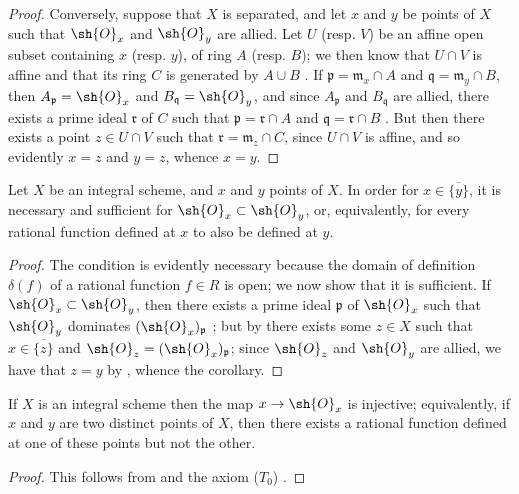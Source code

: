 \begin{proof}
Conversely, suppose that $X$ is separated, and let $x$ and $y$ be points of $X$ such that $\sh{O}_x$ and $\sh{O}_y$ are allied.
Let $U$ (resp. $V$) be an affine open subset containing $x$ (resp. $y$), of ring $A$ (resp. $B$);
we then know that $U\cap V$ is affine and that its ring $C$ is generated by $A\cup B$ .
If $\mathfrak{p}=\mathfrak{m}_x\cap A$ and $\mathfrak{q}=\mathfrak{m}_y\cap B$, then $A_\mathfrak{p}=\sh{O}_x$ and $B_\mathfrak{q}=\sh{O}_y$, and since $A_\mathfrak{p}$ and $B_\mathfrak{q}$ are allied, there exists a prime ideal $\mathfrak{r}$ of $C$ such that $\mathfrak{p}=\mathfrak{r}\cap A$ and $\mathfrak{q}=\mathfrak{r}\cap B$ .
But then there exists a point $z\in U\cap V$ such that $\mathfrak{r}=\mathfrak{m}_z\cap C$, since $U\cap V$ is affine, and so evidently $x=z$ and $y=z$, whence $x=y$.
\end{proof}

\begin{corollary}[8.2.3]
\label{I.8.2.3}
Let $X$ be an integral scheme, and $x$ and $y$ points of $X$.
In order for $x\in\overline{\{y\}}$, it is necessary and
sufficient for $\sh{O}_x\subset\sh{O}_y$, or, equivalently, for every rational
function defined at $x$ to also be defined at $y$.
\end{corollary}

\begin{proof}
The condition is evidently necessary because the domain of definition $\delta(f)$ of a rational function $f\in R$ is open;
we now show that it is sufficient.
If $\sh{O}_x\subset\sh{O}_y$, then there exists a prime ideal $\mathfrak{p}$ of $\sh{O}_x$ such that $\sh{O}_y$ dominates $(\sh{O}_x)_\mathfrak{p}$ ;
but by  there exists some $z\in X$ such that $x\in\overline{\{z\}}$ and $\sh{O}_z=(\sh{O}_x)_\mathfrak{p}$;
since $\sh{O}_z$ and $\sh{O}_y$ are allied, we have that $z=y$ by , whence the corollary.
\end{proof}

\begin{corollary}[8.2.4]
\label{I.8.2.4}
If $X$ is an integral scheme then the map $x\to\sh{O}_x$ is injective; equivalently, if $x$ and $y$ are two distinct points of $X$, then there exists a rational function defined at one of these points but not the other.
\end{corollary}

\begin{proof}
This follows from  and the axiom ($T_0$) .
\end{proof}

